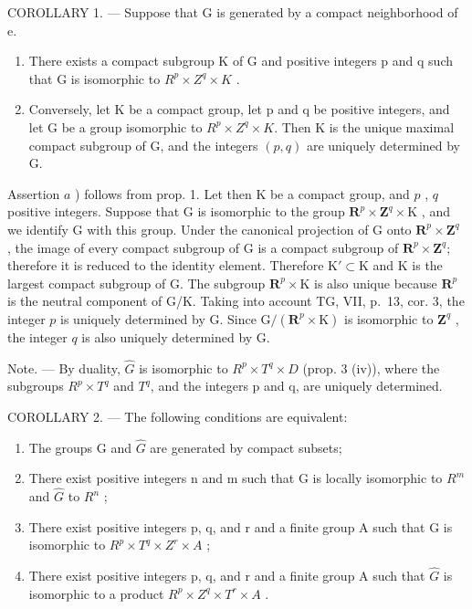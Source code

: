 COROLLARY 1. --- Suppose that G is generated by a compact neighborhood of e.

\begin{enumerate}
\def\labelenumi{\alph{enumi})}
\item
  There exists a compact subgroup K of G and positive integers p and q such that G is isomorphic to \(R^{p} \times Z^{q} \times K\) .
\item
  Conversely, let K be a compact group, let p and q be positive integers, and let G be a group isomorphic to \(R^{p} \times Z^{q} \times K\). Then K is the unique maximal compact subgroup of G, and the integers \((p,q)\) are uniquely determined by G.
\end{enumerate}

Assertion \(a\) ) follows from prop. 1. Let then K be a compact group, and \(p\) , \(q\) positive integers. Suppose that G is isomorphic to the group \(\mathbf{R}^{p} \times \mathbf{Z}^{q} \times \mathrm{K}\) , and we identify G with this group. Under the canonical projection of G onto \(\mathbf{R}^{p} \times \mathbf{Z}^{q}\) , the image of every compact subgroup of G is a compact subgroup of \(\mathbf{R}^{p} \times \mathbf{Z}^{q}\); therefore it is reduced to the identity element. Therefore \(\mathrm{K}' \subset \mathrm{K}\) and K is the largest compact subgroup of G. The subgroup \(\mathbf{R}^{p} \times \mathrm{K}\) is also unique because \(\mathbf{R}^{p}\) is the neutral component of G/K. Taking into account TG, VII, p.~13, cor. 3, the integer \(p\) is uniquely determined by G. Since \(\mathrm{G}/(\mathbf{R}^{p} \times \mathrm{K})\) is isomorphic to \(\mathbf{Z}^{q}\) , the integer \(q\) is also uniquely determined by G.

Note. --- By duality, \(\hat{G}\) is isomorphic to \(R^{p} \times T^{q} \times D\) (prop. 3 (iv)), where the subgroups \(R^{p} \times T^{q}\) and \(T^{q}\), and the integers p and q, are uniquely determined.

COROLLARY 2. --- The following conditions are equivalent:

\begin{enumerate}
\def\labelenumi{(\roman{enumi})}
\item
  The groups G and \(\hat{G}\) are generated by compact subsets;
\item
  There exist positive integers n and m such that G is locally isomorphic to \(R^{m}\) and \(\hat{G}\) to \(R^{n}\) ;
\item
  There exist positive integers p, q, and r and a finite group A such that G is isomorphic to \(R^{p} \times T^{q} \times Z^{r} \times A\) ;
\item
  There exist positive integers p, q, and r and a finite group A such that \(\hat{G}\) is isomorphic to a product \(R^{p} \times Z^{q} \times T^{r} \times A\) .
\end{enumerate}

